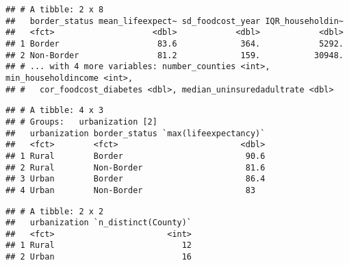 \documentclass[]{article}
\newenvironment{Shaded}{\begin{snugshade}}{\end{snugshade}}
\newcommand{\KeywordTok}[1]{\textcolor[rgb]{0.13,0.29,0.53}{\textbf{#1}}}
\newcommand{\NormalTok}[1]{#1}
\newcommand{\OperatorTok}[1]{\textcolor[rgb]{0.81,0.36,0.00}{\textbf{#1}}}
\newcommand{\StringTok}[1]{\textcolor[rgb]{0.31,0.60,0.02}{#1}}
\begin{document}
\begin{verbatim}
## # A tibble: 2 x 8
##   border_status mean_lifeexpect~ sd_foodcost_year IQR_householdin~
##   <fct>                    <dbl>            <dbl>            <dbl>
## 1 Border                    83.6             364.            5292.
## 2 Non-Border                81.2             159.           30948.
## # ... with 4 more variables: number_counties <int>, min_householdincome <int>,
## #   cor_foodcost_diabetes <dbl>, median_uninsuredadultrate <dbl>
\end{verbatim}

\begin{Shaded}
\end{Shaded}

\begin{verbatim}
## # A tibble: 4 x 3
## # Groups:   urbanization [2]
##   urbanization border_status `max(lifeexpectancy)`
##   <fct>        <fct>                         <dbl>
## 1 Rural        Border                         90.6
## 2 Rural        Non-Border                     81.6
## 3 Urban        Border                         86.4
## 4 Urban        Non-Border                     83
\end{verbatim}

\begin{Shaded}
\end{Shaded}

\begin{verbatim}
## # A tibble: 2 x 2
##   urbanization `n_distinct(County)`
##   <fct>                       <int>
## 1 Rural                          12
## 2 Urban                          16
\end{verbatim}

\begin{Shaded}
\end{Shaded}
\end{document}
